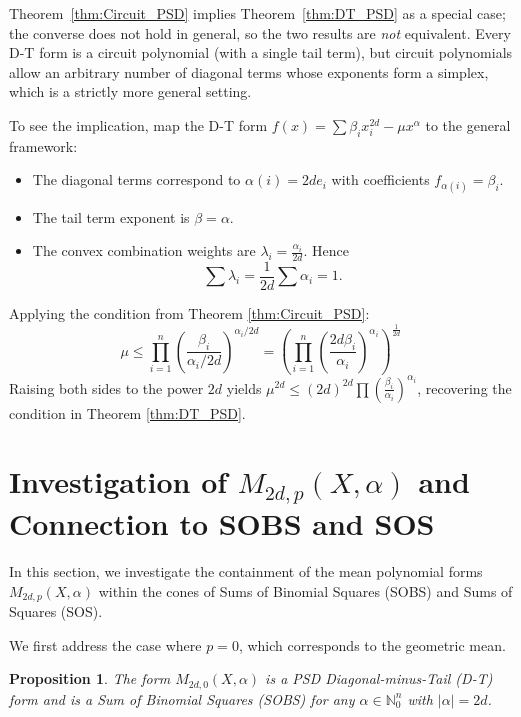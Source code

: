 \documentclass{article}
\newtheorem{proposition}{Proposition}
\begin{document}
Theorem~\ref{thm:Circuit_PSD} implies Theorem~\ref{thm:DT_PSD} as a special case; the converse does not 
hold in general, so the two results are \emph{not} equivalent. Every D-T form is a circuit polynomial 
(with a single tail term), but circuit polynomials allow an arbitrary number of diagonal terms whose 
exponents form a simplex, which is a strictly more general setting.

To see the implication, map the D-T form $f(x) = \sum \beta_i x_i^{2d} - \mu x^{\alpha}$ to the general framework:
\begin{itemize}
    \item The diagonal terms correspond to $\alpha(i) = 2d e_i$ with coefficients $f_{\alpha(i)} = \beta_i$.
    \item The tail term exponent is $\beta = \alpha$.
    \item The convex combination weights are $\lambda_i = \frac{\alpha_i}{2d}$. 
    Hence
    \[
        \sum \lambda_i = \frac{1}{2d} \sum \alpha_i = 1.
    \]
\end{itemize}
Applying the condition from Theorem \ref{thm:Circuit_PSD}:
\[
   \mu \leq \prod_{i=1}^n \left( \frac{\beta_i}{\alpha_i/2d} \right)^{\alpha_i/2d} = \left( \prod_{i=1}^n \left( \frac{2d \beta_i}{\alpha_i} \right)^{\alpha_i} \right)^{\frac{1}{2d}}
\]
Raising both sides to the power $2d$ yields $\mu^{2d} \leq (2d)^{2d} \prod (\frac{\beta_i}{\alpha_i})^{\alpha_i}$, 
recovering the condition in Theorem \ref{thm:DT_PSD}.

\section{\texorpdfstring{Investigation of $M_{2d,p}(X,\alpha)$ and Connection to SOBS and SOS}{Investigation of M2d,p(X,alpha) and Connection to SOBS and SOS}}
\label{s04}

In this section, we investigate the containment of the mean polynomial forms $M_{2d,p}(X, \alpha)$ within the 
cones of Sums of Binomial Squares (SOBS) and Sums of Squares (SOS).

We first address the case where $p=0$, which corresponds to the geometric mean.

\begin{proposition}\label{prop:M_2d_0_SOBS}
The form $M_{2d,0}(X, \alpha)$ is a PSD Diagonal-minus-Tail (D-T) form and is a Sum of Binomial Squares (SOBS) 
for any $\alpha \in \mathbb{N}_0^n$ with $|\alpha|=2d$.
\end{proposition}
\end{document}
